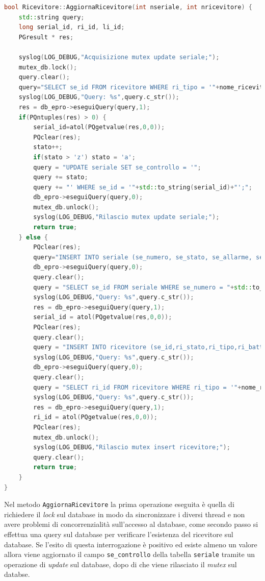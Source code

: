 \begin{lstlisting}[language=C++,caption=Metodo AggiornaRicevitore,label=lst:aggiornaRicevitore]
bool Ricevitore::AggiornaRicevitore(int nseriale, int nricevitore) {
    std::string query;
    long serial_id, ri_id, li_id;
    PGresult * res;
    
    syslog(LOG_DEBUG,"Acquisizione mutex update seriale;");
    mutex_db.lock();
    query.clear();
    query="SELECT se_id FROM ricevitore WHERE ri_tipo = '"+nome_ricevitore+"';";
    syslog(LOG_DEBUG,"Query: %s",query.c_str());
    res = db_epro->eseguiQuery(query,1);
    if(PQntuples(res) > 0) {
        serial_id=atol(PQgetvalue(res,0,0));
        PQclear(res);
        stato++;
        if(stato > 'z') stato = 'a';
        query = "UPDATE seriale SET se_controllo = '";
        query += stato;
        query += "' WHERE se_id = '"+std::to_string(serial_id)+"';";
        db_epro->eseguiQuery(query,0);
        mutex_db.unlock();
        syslog(LOG_DEBUG,"Rilascio mutex update seriale;");
        return true;
    } else {
        PQclear(res);
        query="INSERT INTO seriale (se_numero, se_stato, se_allarme, se_controllo) VALUES ('"+std::to_string(nseriale)+"','s',0,'a');";
        db_epro->eseguiQuery(query,0);
        query.clear();
        query = "SELECT se_id FROM seriale WHERE se_numero = "+std::to_string(nseriale)+";";
        syslog(LOG_DEBUG,"Query: %s",query.c_str());
        res = db_epro->eseguiQuery(query,1);
        serial_id = atol(PQgetvalue(res,0,0));
        PQclear(res);
        query.clear();
        query = "INSERT INTO ricevitore (se_id,ri_stato,ri_tipo,ri_batteria,ri_modalita,ri_mancanza_220, ri_stampante, ri_collegato, ri_numero) VALUES('"+std::to_string(serial_id)+"',0,'"+nome_ricevitore+"',0,0,0,0,0,"+std::to_string(nricevitore)+");";
        syslog(LOG_DEBUG,"Query: %s",query.c_str());
        db_epro->eseguiQuery(query,0);
        query.clear();
        query = "SELECT ri_id FROM ricevitore WHERE ri_tipo = '"+nome_ricevitore+"';";
        syslog(LOG_DEBUG,"Query: %s",query.c_str());
        res = db_epro->eseguiQuery(query,1);
        ri_id = atol(PQgetvalue(res,0,0));
        PQclear(res);
        mutex_db.unlock();
        syslog(LOG_DEBUG,"Rilascio mutex insert ricevitore;");
        query.clear();
        return true;
    }
}
\end{lstlisting}
Nel metodo \texttt{AggiornaRicevitore} la prima operazione eseguita è quella di richiedere il \emph{lock} sul database in modo da sincronizzare i diversi thread e non avere problemi di concorrenzialità sull'accesso al database, come secondo passo si effettua una query sul database per verificare l'esistenza del ricevitore sul database. Se l'esito di questa interrogazione è positivo ed esiste almeno un valore allora viene aggiornato il campo \texttt{se\_controllo} della tabella \texttt{seriale} tramite un operazione di \emph{update} sul database, dopo di che viene rilasciato il \emph{mutex} sul databse.
